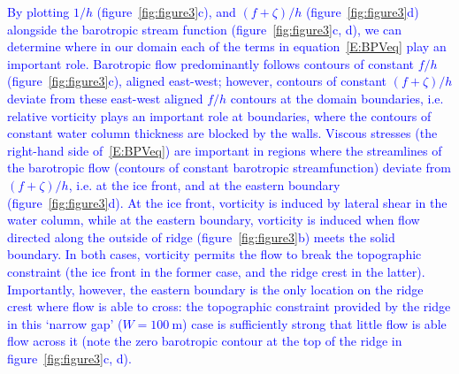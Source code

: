 \documentclass[draft]{agujournal2019}
\newcommand{\blue}[1]{\textcolor{blue}{#1}}
\begin{document}
\blue{By plotting $1/h$ (figure~\ref{fig:figure3}c), and $(f + \zeta)/h$ (figure~\ref{fig:figure3}d) alongside the barotropic stream function (figure~\ref{fig:figure3}c, d), we can determine where in our domain each of the terms in equation~\eqref{E:BPVeq} play an important role. Barotropic flow predominantly follows contours of constant $f/h$ (figure~\ref{fig:figure3}c), aligned east-west; however, contours of constant $(f + \zeta)/h$ deviate from these east-west aligned $f/h$ contours at the domain boundaries, i.e. relative vorticity plays an important role at boundaries, where the contours of constant water column thickness are blocked by the walls. Viscous stresses (the right-hand side of~\eqref{E:BPVeq}) are important in regions where the streamlines of the barotropic flow (contours of constant barotropic streamfunction) deviate from $(f + \zeta)/h$, i.e. at the ice front, and at the eastern boundary (figure~\ref{fig:figure3}d). At the ice front, vorticity is induced by lateral shear in the water column, while at the eastern boundary, vorticity is induced when flow directed along the outside of ridge (figure~\ref{fig:figure3}b) meets the solid boundary. In both cases, vorticity permits the flow to break the topographic constraint (the ice front in the former case, and the ridge crest in the latter). Importantly, however, the eastern boundary is the only location on the ridge crest where flow is able to cross: the topographic constraint provided by the ridge in this `narrow gap' ($W=100~\text{m}$) case is sufficiently strong that little flow is able flow across it (note the zero barotropic contour at the top of the ridge in figure~\ref{fig:figure3}c, d).}

\end{document}
